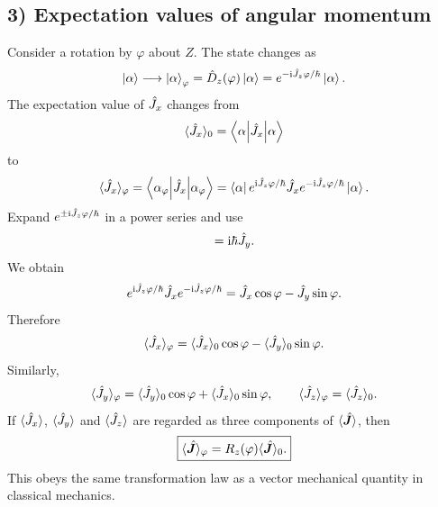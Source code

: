 \subsection*{3) Expectation values of angular momentum}
Consider a rotation by $\varphi$ about $Z$. The state changes as
\begin{equation}
\left|\alpha\right\rangle\longrightarrow\left|\alpha\right\rangle_\varphi
=\hat{D}_z(\varphi)\left|\alpha\right\rangle=e^{-\mathrm{i}\hat{J}_z\varphi/\hbar}\left|\alpha\right\rangle.
\end{equation}
The expectation value of $\hat{J}_x$ changes from
\begin{equation}
\langle\hat{J}_x\rangle_0=\left\langle\alpha\middle|\hat{J}_x\middle|\alpha\right\rangle
\end{equation}
to
\begin{equation}
\langle\hat{J}_x\rangle_\varphi
=\left\langle\alpha_\varphi\middle|\hat{J}_x\middle|\alpha_\varphi\right\rangle
=\left\langle\alpha\right| e^{\mathrm{i}\hat{J}_z\varphi/\hbar}\hat{J}_xe^{-\mathrm{i}\hat{J}_z\varphi/\hbar}\left|\alpha\right\rangle.
\end{equation}
Expand $e^{\pm\mathrm{i}\hat{J}_z\varphi/\hbar}$ in a power series and use
\begin{equation}
[\op J_z,\op J_x]=\ii\hbar\op J_y.
\end{equation}
We obtain
\begin{equation}
e^{\mathrm{i}\hat{J}_z\varphi/\hbar}\hat{J}_xe^{-\mathrm{i}\hat{J}_z\varphi/\hbar}
=\hat{J}_x\cos\varphi-\hat{J}_y\sin\varphi.
\end{equation}
Therefore
\begin{equation}
\langle\hat{J}_x\rangle_\varphi
=\langle\hat{J}_x\rangle_0\cos\varphi-\langle\hat{J}_y\rangle_0\sin\varphi.
\end{equation}
Similarly,
\begin{equation}
\langle\hat{J}_y\rangle_\varphi
=\langle\hat{J}_y\rangle_0\cos\varphi+\langle\hat{J}_x\rangle_0\sin\varphi,
\qquad\langle\hat{J}_z\rangle_\varphi=\langle\hat{J}_z\rangle_0.
\end{equation}
If $\langle\hat{J}_x\rangle$, $\langle\hat{J}_y\rangle$ and $\langle\hat{J}_z\rangle$ are regarded as three components of $\langle\hat{\bm{J}}\rangle$, then
\begin{equation}
\boxed{\langle\hat{\bm{J}}\rangle_\varphi=R_z(\varphi)\langle\hat{\bm{J}}\rangle_0.}
\end{equation}
This obeys the same transformation law as a vector mechanical quantity in classical mechanics.